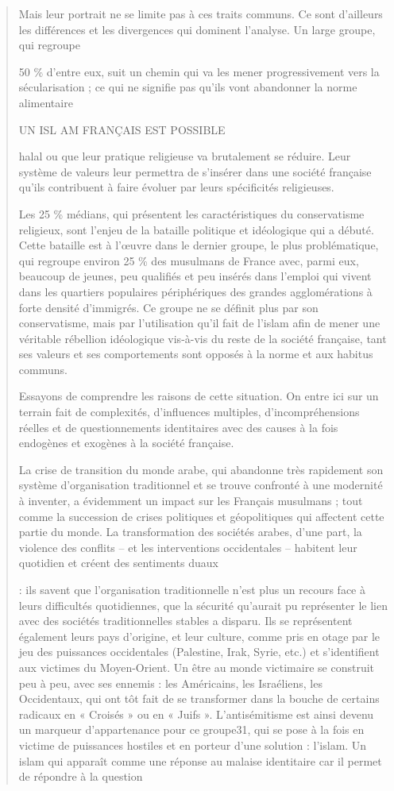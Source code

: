 \begin{quote}
Mais leur portrait ne se limite pas à ces traits communs. Ce sont
d'ailleurs les différences et les divergences qui dominent l'analyse. Un
large groupe, qui regroupe

50 \% d'entre eux, suit un chemin qui va les mener progressivement vers
la sécularisation ; ce qui ne signifie pas qu'ils vont abandonner la
norme alimentaire

UN ISL AM FRANÇAIS EST POSSIBLE

halal ou que leur pratique religieuse va brutalement se réduire. Leur
système de valeurs leur permettra de s'insérer dans une société
française qu'ils contribuent à faire évoluer par leurs spécificités
religieuses.

Les 25 \% médians, qui présentent les caractéristiques du conservatisme
religieux, sont l'enjeu de la bataille politique et idéologique qui a
débuté. Cette bataille est à l'œuvre dans le dernier groupe, le plus
problématique, qui regroupe environ 25 \% des musulmans de France avec,
parmi eux, beaucoup de jeunes, peu qualifiés et peu insérés dans
l'emploi qui vivent dans les quartiers populaires périphériques des
grandes agglomérations à forte densité d'immigrés. Ce groupe ne se
définit plus par son conservatisme, mais par l'utilisation qu'il fait de
l'islam afin de mener une véritable rébellion idéologique vis-à-vis du
reste de la société française, tant ses valeurs et ses comportements
sont opposés à la norme et aux habitus communs.

Essayons de comprendre les raisons de cette situation. On entre ici sur
un terrain fait de complexités, d'influences multiples,
d'incompréhensions réelles et de questionnements identitaires avec des
causes à la fois endogènes et exogènes à la société française.

La crise de transition du monde arabe, qui abandonne très rapidement son
système d'organisation traditionnel et se trouve confronté à une
modernité à inventer, a évidemment un impact sur les Français musulmans
; tout comme la succession de crises politiques et géopolitiques qui
affectent cette partie du monde. La transformation des sociétés arabes,
d'une part, la violence des conflits -- et les interventions
occidentales -- habitent leur quotidien et créent des sentiments duaux

: ils savent que l'organisation traditionnelle n'est plus un recours
face à leurs difficultés quotidiennes, que la sécurité qu'aurait pu
représenter le lien avec des sociétés traditionnelles stables a disparu.
Ils se représentent également leurs pays d'origine, et leur culture,
comme pris en otage par le jeu des puissances occidentales (Palestine,
Irak, Syrie, etc.) et s'identifient aux victimes du Moyen-Orient. Un
être au monde victimaire se construit peu à peu, avec ses ennemis : les
Américains, les Israéliens, les Occidentaux, qui ont tôt fait de se
transformer dans la bouche de certains radicaux en « Croisés » ou en «
Juifs ». L'antisémitisme est ainsi devenu un marqueur d'appartenance
pour ce groupe31, qui se pose à la fois en victime de puissances
hostiles et en porteur d'une solution : l'islam. Un islam qui apparaît
comme une réponse au malaise identitaire car il permet de répondre à la
question


\end{quote}
